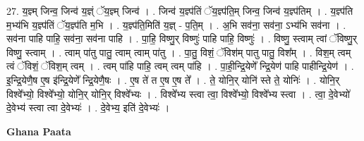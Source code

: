\documentclass[17pt]{extarticle}
\begin{document}
27. य॒ज्ञ्म् जिन्व॒ जिन्व॑ य॒ज्ञ्ं ॅय॒ज्ञ्म् जिन्व॑ । . जिन्व॑ य॒ज्ञ्प॑तिं ॅय॒ज्ञ्प॑ति॒म् जिन्व॒ जिन्व॑ य॒ज्ञ्प॑तिम् । . य॒ज्ञ्प॑ति म॒भ्य॑भि य॒ज्ञ्प॑तिं ॅय॒ज्ञ्प॑ति म॒भि । . य॒ज्ञ्प॑ति॒मिति॑ य॒ज्ञ् - प॒ति॒म् । . अ॒भि सव॑ना॒ सव॑ना॒ ऽभ्य॑भि सव॑ना । . सव॑ना पाहि पाहि॒ सव॑ना॒ सव॑ना पाहि । . पा॒हि॒ विष्णु॒र् विष्णुः॑ पाहि पाहि॒ विष्णुः॑ । . विष्णु॒ स्त्वाम् त्वां ॅविष्णु॒र् विष्णु॒ स्त्वाम् । . त्वाम् पा॑तु पातु॒ त्वाम् त्वाम् पा॑तु । . पा॒तु॒ विशं॒ ॅविश॑म् पातु पातु॒ विश᳚म् । . विश॒म् त्वम् त्वं ॅविशं॒ ॅविश॒म् त्वम् । . त्वम् पा॑हि पाहि॒ त्वम् त्वम् पा॑हि । . पा॒ही॒न्द्रि॒येणे᳚ न्द्रि॒येण॑ पाहि पाहीन्द्रि॒येण॑ । . इ॒न्द्रि॒येणै॒ष ए॒ष इ॑न्द्रि॒येणे᳚ न्द्रि॒येणै॒षः । . ए॒ष ते॑ त ए॒ष ए॒ष ते᳚ । . ते॒ योनि॒र् योनि॑ स्ते ते॒ योनिः॑ । . योनि॒र् विश्वे᳚भ्यो॒ विश्वे᳚भ्यो॒ योनि॒र् योनि॒र् विश्वे᳚भ्यः । . विश्वे᳚भ्य स्त्वा त्वा॒ विश्वे᳚भ्यो॒ विश्वे᳚भ्य स्त्वा । . त्वा॒ दे॒वेभ्यो॑ दे॒वेभ्य॑ स्त्वा त्वा दे॒वेभ्यः॑ । . दे॒वेभ्य॒ इति॑ दे॒वेभ्यः॑ । \newline

\textbf{Ghana Paata } \newline
\end{document}

